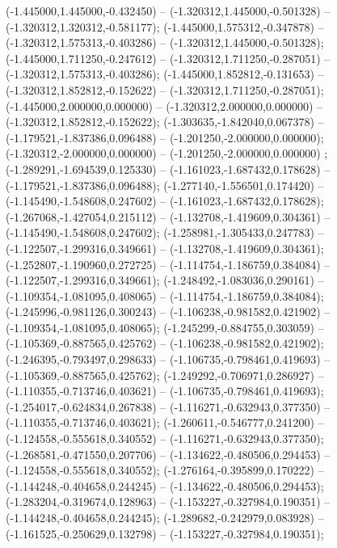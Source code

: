  (-1.445000,1.445000,-0.432450) -- (-1.320312,1.445000,-0.501328) -- (-1.320312,1.320312,-0.581177);
 (-1.445000,1.575312,-0.347878) -- (-1.320312,1.575313,-0.403286) -- (-1.320312,1.445000,-0.501328);
 (-1.445000,1.711250,-0.247612) -- (-1.320312,1.711250,-0.287051) -- (-1.320312,1.575313,-0.403286);
 (-1.445000,1.852812,-0.131653) -- (-1.320312,1.852812,-0.152622) -- (-1.320312,1.711250,-0.287051);
 (-1.445000,2.000000,0.000000) -- (-1.320312,2.000000,0.000000) -- (-1.320312,1.852812,-0.152622);
 (-1.303635,-1.842040,0.067378) -- (-1.179521,-1.837386,0.096488) -- (-1.201250,-2.000000,0.000000);
 (-1.320312,-2.000000,0.000000) -- (-1.201250,-2.000000,0.000000) ;
 (-1.289291,-1.694539,0.125330) -- (-1.161023,-1.687432,0.178628) -- (-1.179521,-1.837386,0.096488);
 (-1.277140,-1.556501,0.174420) -- (-1.145490,-1.548608,0.247602) -- (-1.161023,-1.687432,0.178628);
 (-1.267068,-1.427054,0.215112) -- (-1.132708,-1.419609,0.304361) -- (-1.145490,-1.548608,0.247602);
 (-1.258981,-1.305433,0.247783) -- (-1.122507,-1.299316,0.349661) -- (-1.132708,-1.419609,0.304361);
 (-1.252807,-1.190960,0.272725) -- (-1.114754,-1.186759,0.384084) -- (-1.122507,-1.299316,0.349661);
 (-1.248492,-1.083036,0.290161) -- (-1.109354,-1.081095,0.408065) -- (-1.114754,-1.186759,0.384084);
 (-1.245996,-0.981126,0.300243) -- (-1.106238,-0.981582,0.421902) -- (-1.109354,-1.081095,0.408065);
 (-1.245299,-0.884755,0.303059) -- (-1.105369,-0.887565,0.425762) -- (-1.106238,-0.981582,0.421902);
 (-1.246395,-0.793497,0.298633) -- (-1.106735,-0.798461,0.419693) -- (-1.105369,-0.887565,0.425762);
 (-1.249292,-0.706971,0.286927) -- (-1.110355,-0.713746,0.403621) -- (-1.106735,-0.798461,0.419693);
 (-1.254017,-0.624834,0.267838) -- (-1.116271,-0.632943,0.377350) -- (-1.110355,-0.713746,0.403621);
 (-1.260611,-0.546777,0.241200) -- (-1.124558,-0.555618,0.340552) -- (-1.116271,-0.632943,0.377350);
 (-1.268581,-0.471550,0.207706) -- (-1.134622,-0.480506,0.294453) -- (-1.124558,-0.555618,0.340552);
 (-1.276164,-0.395899,0.170222) -- (-1.144248,-0.404658,0.244245) -- (-1.134622,-0.480506,0.294453);
 (-1.283204,-0.319674,0.128963) -- (-1.153227,-0.327984,0.190351) -- (-1.144248,-0.404658,0.244245);
 (-1.289682,-0.242979,0.083928) -- (-1.161525,-0.250629,0.132798) -- (-1.153227,-0.327984,0.190351);
